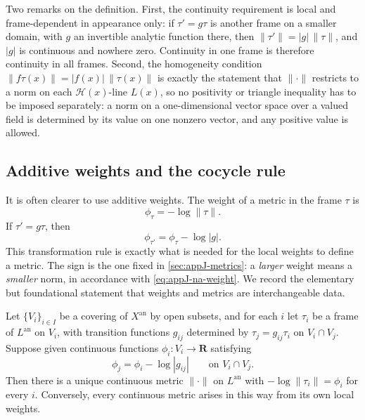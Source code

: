 Two remarks on the definition. First, the continuity requirement is
local and frame-dependent in appearance only: if $\tau'=g\tau$ is another
frame on a smaller domain, with $g$ an invertible analytic function there,
then $\|\tau'\|=|g|\,\|\tau\|$, and $|g|$ is continuous and nowhere
zero. Continuity in one frame is therefore continuity in all frames.
Second, the homogeneity condition $\|f\tau(x)\|=|f(x)|\,\|\tau(x)\|$ is
exactly the statement that $\|\cdot\|$ restricts to a norm on each
$\mathcal H(x)$-line $L(x)$, so no positivity or triangle inequality has
to be imposed separately: a norm on a one-dimensional vector space over a
valued field is determined by its value on one nonzero vector, and any
positive value is allowed.

\subsection{Additive weights and the cocycle rule}

It is often clearer to use additive weights. The weight of a metric in the
frame $\tau$ is
\[
                         \phi_\tau=-\log\|\tau\|.
\]
If $\tau'=g\tau$, then
\[
                         \phi_{\tau'}=\phi_\tau-\log|g|.
\]
This transformation rule is exactly what is needed for the local weights to
define a metric. The sign is the one fixed in \cref{sec:appJ-metrics}: a
\emph{larger} weight means a \emph{smaller} norm, in accordance with
\eqref{eq:appJ-na-weight}. We record the elementary but foundational
statement that weights and metrics are interchangeable data.

\begin{lemma}
\label{lem:metrics-weight-cocycle}
Let $\{V_i\}_{i\in I}$ be a covering of $X^{\mathrm{an}}$ by open
subsets, and for each $i$ let $\tau_i$ be a frame of $L^{\mathrm{an}}$
on $V_i$, with transition functions $g_{ij}$ determined by
$\tau_j=g_{ij}\tau_i$ on $V_i\cap V_j$. Suppose given continuous
functions $\phi_i:V_i\to\mathbf R$ satisfying
\begin{equation}
\label{eq:metrics-weight-cocycle}
 \phi_j=\phi_i-\log|g_{ij}|
 \qquad\text{on }V_i\cap V_j .
\end{equation}
Then there is a unique continuous metric $\|\cdot\|$ on
$L^{\mathrm{an}}$ with $-\log\|\tau_i\|=\phi_i$ for every $i$.
Conversely, every continuous metric arises in this way from its own local
weights.
\end{lemma}

